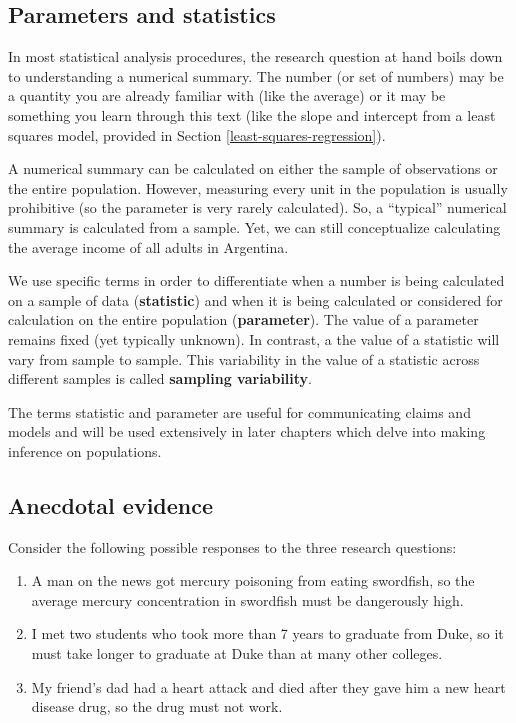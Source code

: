 \documentclass[
  10pt,
  openany]{book}
\providecommand{\tightlist}{%
  \setlength{\itemsep}{0pt}\setlength{\parskip}{0pt}}
\theoremstyle{definition}
\theoremstyle{definition}
\theoremstyle{definition}
\theoremstyle{definition}
\theoremstyle{remark}
\begin{document}
\subsection{Parameters and statistics}\label{parameters-and-statistics}

In most statistical analysis procedures, the research question at hand boils down to understanding a numerical summary.
The number (or set of numbers) may be a quantity you are already familiar with (like the average) or it may be something you learn through this text (like the slope and intercept from a least squares model, provided in Section \ref{least-squares-regression}).

A numerical summary can be calculated on either the sample of observations or the entire population.
However, measuring every unit in the population is usually prohibitive (so the parameter is very rarely calculated).
So, a ``typical'' numerical summary is calculated from a sample.
Yet, we can still conceptualize calculating the average income of all adults in Argentina.

We use specific terms in order to differentiate when a number is being calculated on a sample of data (\textbf{statistic}) and when it is being calculated or considered for calculation on the entire population (\textbf{parameter}). The value of a parameter remains fixed (yet typically unknown). In contrast, a the value of a statistic will vary from sample to sample. This variability in the value of a statistic across different samples is called \textbf{sampling variability}.

The terms statistic and parameter are useful for communicating claims and models and will be used extensively in later chapters which delve into making inference on populations.

\subsection{Anecdotal evidence}\label{anecdotal-evidence}


Consider the following possible responses to the three research questions:

\begin{enumerate}
\def\labelenumi{\arabic{enumi}.}
\tightlist
\item
  A man on the news got mercury poisoning from eating swordfish, so the average mercury concentration in swordfish must be dangerously high.
\item
  I met two students who took more than 7 years to graduate from Duke, so it must take longer to graduate at Duke than at many other colleges.
\item
  My friend's dad had a heart attack and died after they gave him a new heart disease drug, so the drug must not work.
\end{enumerate}
\end{document}
